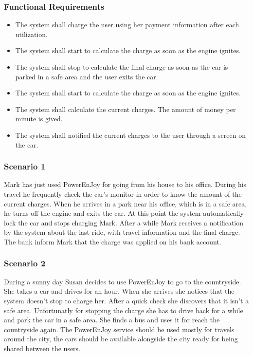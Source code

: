 \subsubsection{Functional Requirements}
\begin{itemize}
  \item The system shall charge the user using her payment information after each utilization.
  \item The system shall start to calculate the charge as soon as the engine ignites.
  \item The system shall stop to calculate the final charge as soon as the car is parked in a safe area and the user exits the car.%
  \item The system shall start to calculate the charge as soon as the engine ignites.
  \item The system shall calculate the current charges. The amount of money per minute is gived.
  \item The system shall notified the current charges to the user through a screen on the car.
\end{itemize}

\subsubsection{Scenario 1}
Mark has just used PowerEnJoy for going from his house to his office. During his travel he frequently check the car's monitor in order to know the amount of the current charges. When he arrives in a park near his office, which is in a safe area, he turns off the engine and exits the car. At this point the system automatically lock the car and stops charging Mark. After a while Mark receives a notification by the system about the last ride, with travel information and the final charge. The bank inform Mark that the charge was applied on his bank account. 


\subsubsection{Scenario 2}
During a sunny day Susan decides to use PowerEnJoy to go to the countryside. She takes a car and drives for an hour. When she arrives she notices that the system doesn't stop to charge her. After a quick check she discovers that it isn't a safe area. Unfortunatly for stopping the charge she has to drive back for a while and park the car in a safe area. She finds a bus and uses it for reach the countryside again. The PowerEnJoy service should be used mostly for travels around the city, the cars should be available alongside the city ready for being shared between the users. 

